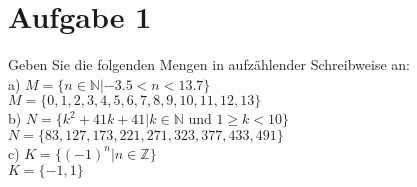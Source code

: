 \section*{Aufgabe 1}

Geben Sie die folgenden Mengen in aufzählender Schreibweise an:\\

a) $M = \{n \in \mathbb{N} | -3.5 < n < 13.7\}$\\

$M = \{0, 1, 2, 3, 4, 5, 6, 7, 8, 9, 10, 11, 12, 13\}$\\

b) $N = \{k^2 + 41k + 41 | k \in \mathbb{N} \text{ und } 1 \geq k < 10\}$\\

$N = \{83, 127, 173, 221, 271, 323, 377, 433, 491\}$\\

c) $K = \{(-1)^n | n \in \mathbb{Z}\}$\\

$K = \{-1, 1\}$\\

